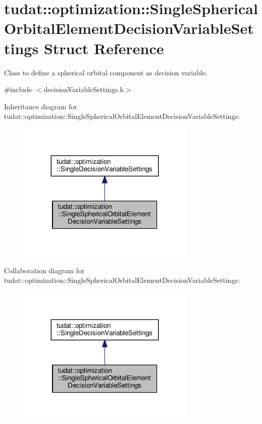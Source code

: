 \hypertarget{structtudat_1_1optimization_1_1SingleSphericalOrbitalElementDecisionVariableSettings}{}\section{tudat\+:\+:optimization\+:\+:Single\+Spherical\+Orbital\+Element\+Decision\+Variable\+Settings Struct Reference}
\label{structtudat_1_1optimization_1_1SingleSphericalOrbitalElementDecisionVariableSettings}


Class to define a spherical orbital component as decision variable.  




{\ttfamily \#include $<$decision\+Variable\+Settings.\+h$>$}



Inheritance diagram for tudat\+:\+:optimization\+:\+:Single\+Spherical\+Orbital\+Element\+Decision\+Variable\+Settings\+:
\nopagebreak
\begin{figure}[H]
\begin{center}
\leavevmode
\includegraphics[width=239pt]{structtudat_1_1optimization_1_1SingleSphericalOrbitalElementDecisionVariableSettings__inherit__graph}
\end{center}
\end{figure}


Collaboration diagram for tudat\+:\+:optimization\+:\+:Single\+Spherical\+Orbital\+Element\+Decision\+Variable\+Settings\+:
\nopagebreak
\begin{figure}[H]
\begin{center}
\leavevmode
\includegraphics[width=239pt]{structtudat_1_1optimization_1_1SingleSphericalOrbitalElementDecisionVariableSettings__coll__graph}
\end{center}
\end{figure}
